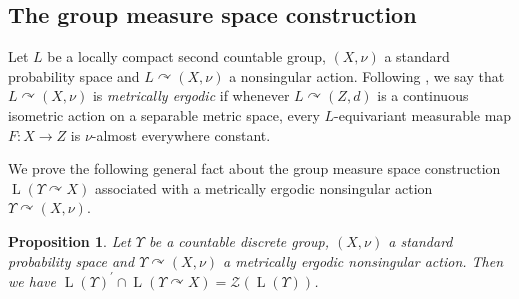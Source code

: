 \documentclass[11pt]{amsart}
\numberwithin{equation}{section}
\theoremstyle{plain}
\newtheorem{prop}[thm]{Proposition}
\theoremstyle{definition}
\newcommand{\rL}{\operatorname{ L}}
\begin{document}
\subsection{The group measure space construction}

Let $L$ be a locally compact second countable group, $(X, \nu)$ a standard probability space and $L \curvearrowright (X, \nu)$ a nonsingular action. Following \cite[Definition 6.5]{BG14}, we say that $L \curvearrowright (X, \nu)$ is {\em metrically ergodic} if whenever $L \curvearrowright (Z, d)$ is a continuous isometric action on a separable metric space, every $L$-equivariant measurable map $F : X \to Z$ is $\nu$-almost everywhere constant. 

We prove the following general fact about the group measure space construction $\rL(\Upsilon \curvearrowright X)$ associated with a metrically ergodic nonsingular action $\Upsilon \curvearrowright (X, \nu)$.

\begin{prop}\label{prop-commutant}
Let $\Upsilon$ be a countable discrete group, $(X, \nu)$ a standard probability space and $\Upsilon \curvearrowright (X, \nu)$ a metrically ergodic nonsingular action. Then we have $\rL(\Upsilon)^\prime \cap \rL(\Upsilon \curvearrowright X) = \mathscr Z(\rL(\Upsilon))$.
\end{prop}
\end{document}
